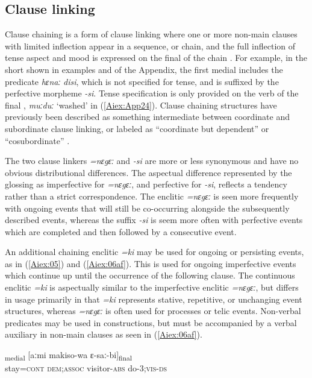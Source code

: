 \documentclass[output=paper]{LSP/langsci}
\begin{document}
\subsection{Clause linking} 
\label{Ailinking}
Clause chaining is a form of clause linking where one or more non-main clauses with limited
inflection appear in a sequence, or chain, and the full inflection of tense aspect and mood is expressed
on the final  of the chain \citep[][374--376]{longacre07}. For example, in the short  shown
in examples  and  of the Appendix, the first medial  includes the predicate \textit{hɛnaː} \textit{disi}, which is not specified for
tense, and is suffixed by the perfective  morpheme \textit{-si}. Tense specification is only provided on the verb of the final , \textit{muːduː} `washed' in (\ref{Aiex:App24}). Clause chaining structures have previously been described as something intermediate
between coordinate and subordinate clause linking, or labeled as ``coordinate but dependent''
\citep{haiman83}  or ``cosubordinate'' \citep{valin84}.

The two clause linkers \textit{=nɛgɛː} and \textit{-si} are more or less synonymous and have no obvious
distributional differences. The aspectual difference represented by the glossing as imperfective for
\textit{=nɛgɛː}, and perfective for \textit{-si}, reflects a tendency rather than a strict correspondence. The enclitic \textit{=nɛgɛː} is seen more frequently with ongoing events that will still be co-occurring alongside the subsequently described events, whereas the suffix \textit{-si} is seem more often  with perfective events which are completed and
then followed by a consecutive event. 

An additional chaining enclitic \textit{=ki} may be used for ongoing or persisting events, as in (\ref{Aiex:05}) and (\ref{Aiex:06af}). This is used for ongoing imperfective events which continue up until the occurrence of the
following clause. The continuous enclitic \textit{=ki} is aspectually similar to the imperfective enclitic \textit{=nɛgɛː}, but differs in usage
primarily in that \textit{=ki} represents stative, repetitive, or unchanging event structures, whereas \textit{=nɛgɛː} is
often used for processes or telic events. Non-verbal predicates may be used in 
constructions, but must be accompanied by a verbal auxiliary in non-main clauses as seen in (\ref{Aiex:06af}).


\begin{exe}
\ex \label{Aiex:05}
\gll [sɛnɛ=\textbf{ki}]\textsubscript{medial} [aːmi makiso-wa ɛ-saː-bi]\textsubscript{final}\\
stay=\textsc{cont} \textsc{dem};\textsc{assoc} visitor-\textsc{abs}	do-\textsc{3};\textsc{vis}-\textsc{ds}\\
\glt {}\\
\end{exe}
\end{document}
